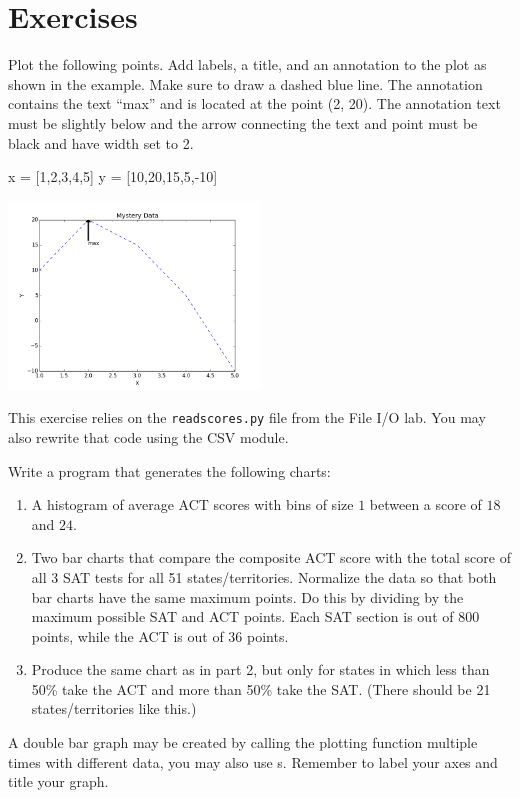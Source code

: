 \documentclass[11pt]{cselabheader}
\begin{document}
\newpage
\section{Exercises}
\begin{ex}[plotpoints.py]
Plot the following points. Add labels, a title, and an annotation to the plot
as shown in the example. Make sure to draw a dashed blue line.
The annotation contains the text ``max'' and is located at the point (2, 20).
The annotation text must be slightly below and the arrow connecting the text
and point must be black and have width set to 2.

\begin{python3code}
x = [1,2,3,4,5]
y = [10,20,15,5,-10]
\end{python3code}

\begin{center}
\includegraphics[width=0.5\textwidth]{img/basic.png}
\end{center}
\end{ex}

\begin{ex}[plotscores.py]
  This exercise relies on the \texttt{readscores.py} file from the File I/O
  lab. You may also rewrite that code using the CSV module.

  Write a program that generates the following charts:
  \begin{enumerate}
    \item A histogram of average ACT scores with bins of size $1$ between a
      score of $18$ and $24$.
    \item Two bar charts that compare the composite ACT score with the
      total score of all 3 SAT tests for all 51 states/territories.
      Normalize the data so that both bar charts have the same maximum points.
      Do this by dividing by the maximum possible SAT and ACT points.
      Each SAT section is out of 800 points, while the ACT is out of 36 points.
    \item Produce the same chart as in part 2, but only for states in which
      less than 50\% take the ACT and more than 50\% take the SAT. (There
      should be 21 states/territories like this.)
  \end{enumerate}

  A double bar graph may be created by calling the 
  plotting function multiple times with different data, you may also use
  s. Remember to label your axes and title your graph.
\end{ex}
\end{document}
